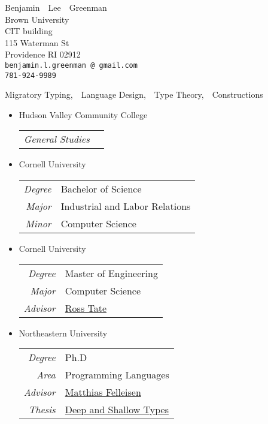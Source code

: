 \documentclass{article}
\makeatletter
\renewcommand{\maketitle}{
\begin{center}
  {\large{Benjamin~~Lee~~Greenman}}
\vspace{0.1cm}
\\Brown University
\\CIT building
\\115 Waterman St
\\Providence RI 02912
\\\texttt{benjamin.l.greenman\,@\,gmail.com}
\\\texttt{781-924-9989}
\end{center}
}
\makeatother
\begin{document}
\maketitle



Migratory Typing,~~Language Design,~~Type Theory,~~Constructions

\begin{itemize}
\item {Hudson Valley Community College} \hfill {}\\
\begin{tabular}{>{\it}r l}
General Studies & \\
\end{tabular}

\item {Cornell University} \hfill {}\\
\begin{tabular}{>{\it}r l}
Degree & Bachelor of Science\\
Major & Industrial and Labor Relations\\
Minor & Computer Science\\
\end{tabular}

\item {Cornell University} \hfill {}\\
\begin{tabular}{>{\it}r l}
Degree & Master of Engineering\\
Major & Computer Science\\
Advisor & \href{http://www.cs.cornell.edu/~ross/}{Ross Tate}
\end{tabular}

\item {Northeastern University} \hfill {}\\
\begin{tabular}{>{\it}r l}
Degree & Ph.D \\
Area & Programming Languages \\
Advisor & \href{http://ccs.neu.edu/home/matthias}{Matthias Felleisen} \\
Thesis & \href{http://ccs.neu.edu/home/types/resources/pdf/g-dissertation-2020.pdf}{Deep and Shallow Types}
\end{tabular}
\end{itemize}
\end{document}
